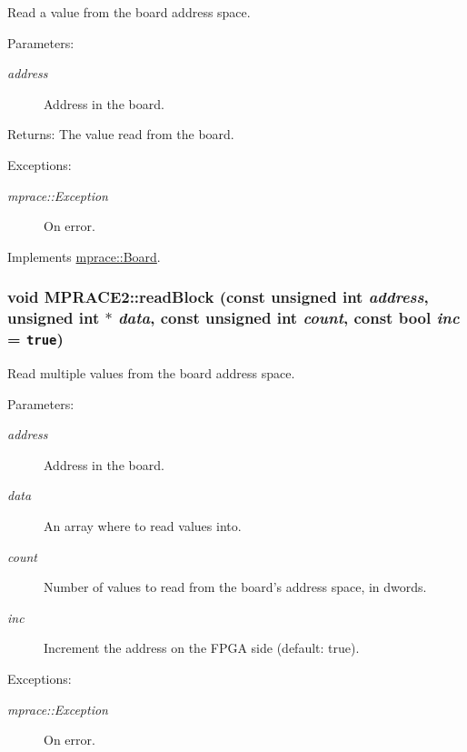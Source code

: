 Read a value from the board address space. 

\begin{Desc}
\item[Parameters:]
\begin{description}
\item[{\em address}]Address in the board. \end{description}
\end{Desc}
\begin{Desc}
\item[Returns:]The value read from the board. \end{Desc}
\begin{Desc}
\item[Exceptions:]
\begin{description}
\item[{\em mprace::Exception}]On error.\end{description}
\end{Desc}


Implements \hyperlink{classmprace_1_1Board_a4}{mprace::Board}.\hypertarget{classmprace_1_1MPRACE2_a5}{
\subsubsection[readBlock]{\setlength{\rightskip}{0pt plus 5cm}void MPRACE2::read\-Block (const unsigned int {\em address}, unsigned int $\ast$ {\em data}, const unsigned int {\em count}, const bool {\em inc} = {\tt true})}}
\label{classmprace_1_1MPRACE2_a5}


Read multiple values from the board address space. 

\begin{Desc}
\item[Parameters:]
\begin{description}
\item[{\em address}]Address in the board. \item[{\em data}]An array where to read values into. \item[{\em count}]Number of values to read from the board's address space, in dwords. \item[{\em inc}]Increment the address on the FPGA side (default: true). \end{description}
\end{Desc}
\begin{Desc}
\item[Exceptions:]
\begin{description}
\item[{\em mprace::Exception}]On error.\end{description}
\end{Desc}


